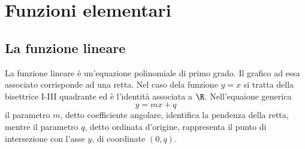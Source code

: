 \documentclass{article}     %
\begin{document}
    \section{Funzioni elementari}
    \subsection{La funzione lineare}
        \begin{wrapfigure}[8]{r}{0.20\textwidth}
            \begin{center}
            \end{center}
        \end{wrapfigure}
        La funzione lineare è un'equazione polinomiale di primo grado. Il grafico ad essa associato corrisponde ad una retta. Nel caso dela funzione $y=x$ si tratta della bisettrice I-III quadrante ed è l'identità associata a $\R$. Nell'equaione generica \[y=mx+q\] il parametro $m$, detto coefficiente angolare, identifica la pendenza della retta, mentre il parametro $q$, detto ordinata d'origine, rappresenta il punto di intersezione con l'asse $y$, di coordinate $(0,q)$.
\end{document}
